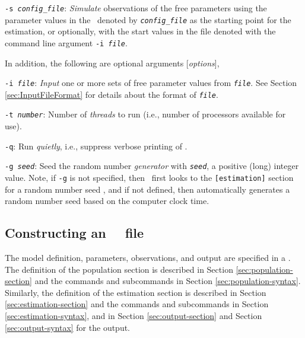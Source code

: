 \begin{description}
\item \texttt{-s \emph{config\_file}}:{\hspace{0.5cm} \emph{Simulate} observations of the free parameters using the parameter values in the \config\ denoted by \emph{\texttt{config\_file}} as the starting point for the estimation, or optionally, with the start values in the file denoted with the command line argument \texttt{-i \emph{file}}.}

\end{description}

In addition, the following are optional arguments [\emph{options}],

\begin{description}
\item \texttt{-i \emph{file}}:{\hspace*{0.5cm} \emph{Input} one or more sets of free parameter values from \texttt{\emph{file}}. See Section \ref{sec:InputFileFormat} for details about the format of \texttt{\emph{file}}.}

\item \texttt{-t \emph{number}}:{\hspace*{0.5cm} Number of \emph{threads} to run (i.e., number of processors available for use).}

\item \texttt{-q}:{\hspace*{0.5cm} Run \emph{quietly}, i.e., suppress verbose printing of \SPM.}

\item \texttt{-g \emph{seed}}:{\hspace*{0.5cm} Seed the random number \emph{generator} with \texttt{\emph{seed}}, a positive (long) integer value. Note, if \texttt{-g} is not specified, then \SPM\ first looks to the \texttt{[estimation]} section for a random number seed , and if not defined, then automatically generates a random number seed based on the computer clock time.}
\end{description}

\subsection{Constructing an \SPM\ \config\ file\label{constructing-spm-config}}

The model definition, parameters, observations, and output are specified in a \config. The definition of the population section is described in Section \ref{sec:population-section} and the commands and subcommands in Section \ref{sec:population-syntax}. Similarly, the definition of the estimation section is described in Section \ref{sec:estimation-section} and the commands and subcommands in Section \ref{sec:estimation-syntax}, and in Section \ref{sec:output-section} and Section \ref{sec:output-syntax} for the output. 

